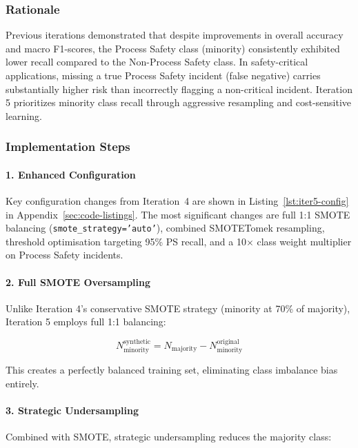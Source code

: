 \documentclass[11pt, titlepage, bibliography=totoc]{scrreprt}
\begin{document}
\subsubsection{Rationale}
Previous iterations demonstrated that despite improvements in overall accuracy and macro F1-scores, the Process Safety class (minority) consistently exhibited lower recall compared to the Non-Process Safety class. In safety-critical applications, missing a true Process Safety incident (false negative) carries substantially higher risk than incorrectly flagging a non-critical incident. Iteration 5 prioritizes minority class recall through aggressive resampling and cost-sensitive learning.

\subsubsection{Implementation Steps}

\paragraph{1. Enhanced Configuration}
Key configuration changes from Iteration~4 are shown in Listing~\ref{lst:iter5-config} in Appendix~\ref{sec:code-listings}. The most significant changes are full 1:1 SMOTE balancing (\texttt{smote\_strategy='auto'}), combined SMOTETomek resampling, threshold optimisation targeting 95\% PS recall, and a 10$\times$ class weight multiplier on Process Safety incidents.

\paragraph{2. Full SMOTE Oversampling}
Unlike Iteration 4's conservative SMOTE strategy (minority at 70\% of majority), Iteration 5 employs full 1:1 balancing:

\begin{equation}
N_{\text{minority}}^{\text{synthetic}} = N_{\text{majority}} - N_{\text{minority}}^{\text{original}}
\end{equation}

This creates a perfectly balanced training set, eliminating class imbalance bias entirely.

\paragraph{3. Strategic Undersampling}
Combined with SMOTE, strategic undersampling reduces the majority class:
\end{document}

